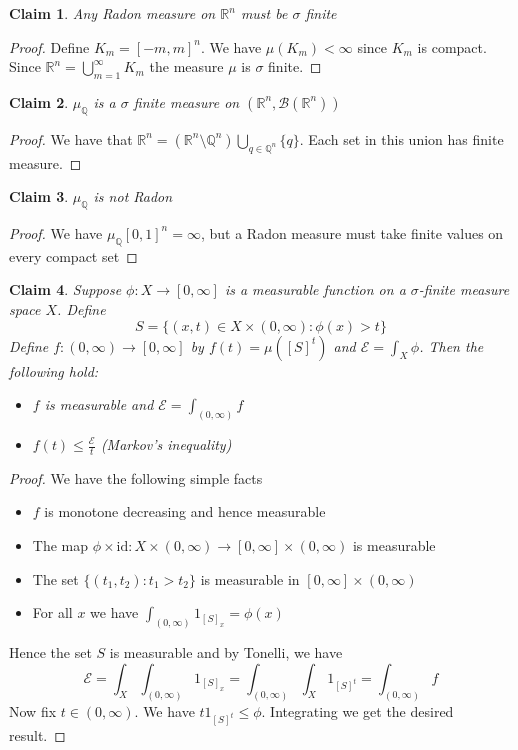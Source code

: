 \documentclass[a4paper,11pt]{article}
\newtheorem{claim}{Claim}
\begin{document}
\begin{claim}
  Any Radon measure on $\mathbb{R}^n$ must be $\sigma$ finite
\end{claim}

\begin{proof}
  Define $K_m=[-m,m]^n$. We have $\mu(K_m)<\infty$ since $K_m$ is compact. 
  Since $\mathbb{R}^n=\bigcup_{m=1}^\infty K_m$ the measure $\mu$ is $\sigma$ finite.
\end{proof}

\begin{claim}
  $\mu_\mathbb{Q}$ is a $\sigma$ finite measure on $(\mathbb{R}^n,\mathcal{B}(\mathbb{R}^n))$
\end{claim}

\begin{proof}
  We have that $\mathbb{R}^n= (\mathbb{R}^n \setminus \mathbb{Q}^n ) \bigcup_{q \in \mathbb{Q}^n}\{q\}$. Each set in this union has finite measure.
\end{proof}

\begin{claim}
  $\mu_\mathbb{Q}$ is not Radon
\end{claim}

\begin{proof}
  We have $\mu_\mathbb{Q}[0,1]^n=\infty$, but a Radon measure must take finite values on every compact set
\end{proof}

\begin{claim}
  Suppose $\phi:X \to [0,\infty]$ is a measurable function on a $\sigma$-finite measure space $X$. 
  Define \[S=\{(x,t) \in X \times (0,\infty):\phi(x)>t\}\] 
  Define $f:(0,\infty) \to [0,\infty]$ by $f(t)=\mu ([S]^t)$ and $\mathcal{E}=\int_X \phi$. Then the following hold:
  \begin{itemize}
    \item $f$ is measurable and $\mathcal{E} = \int_{(0,\infty)}f$
    \item $f(t) \leq \frac{\mathcal{E}}{t}$ (Markov's inequality)
  \end{itemize}
\end{claim}

\begin{proof}
  We have the following simple facts
  \begin{itemize}
    \item $f$ is monotone decreasing and hence measurable
    \item The map $\phi \times \text{id}: X \times (0,\infty) \to [0,\infty] \times (0,\infty)$ is measurable
    \item The set $\{(t_1,t_2):t_1 > t_2\}$ is measurable in $[0,\infty] \times (0,\infty)$
    \item For all $x$ we have $\int_{(0,\infty)}1_{[S]_x}=\phi(x)$
  \end{itemize}
  
  Hence the set $S$ is measurable and by Tonelli, we have 
  \[\mathcal{E}=\int_X \int_{(0,\infty)}1_{[S]_x}=\int_{(0,\infty)}\int_X 1_{[S]^t}=\int_{(0,\infty)}f\]
  Now fix $t \in (0,\infty)$. We have $t1_{[S]^t} \leq \phi$. Integrating we get the desired result.
\end{proof}
\end{document}
